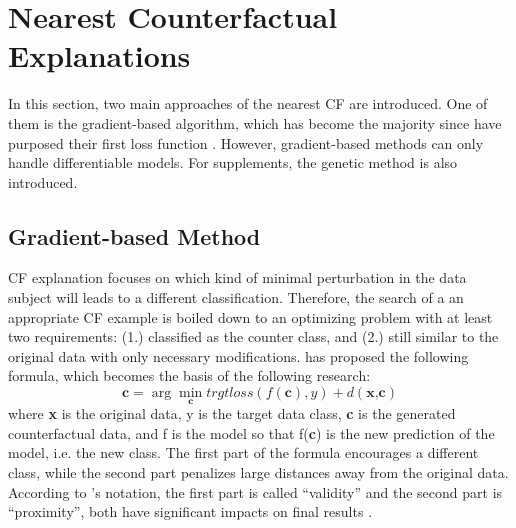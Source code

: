 \section{Nearest Counterfactual Explanations}\label{sec:generation}
In this section, two main approaches of the nearest CF are introduced. One of them is the gradient-based algorithm, which has become the majority since \citeauthor{watcher2017} \cite{watcher2017} have purposed their first loss function \cite{CFReview}. However, gradient-based methods can only handle differentiable models. For supplements, the genetic method is also introduced.

\subsection{Gradient-based Method}\label{sec:lossFunc}
CF explanation focuses on which kind of minimal perturbation in the data subject will leads to a different classification. Therefore, the search of a an appropriate CF example is boiled down to an optimizing problem with at least two requirements: (1.) classified as the counter class, and (2.) still similar to the original data with only necessary modifications. \citeauthor{watcher2017} \cite{watcher2017} has proposed the following formula, which becomes the basis of the following research:
\begin{equation}\label{eq:watcher}
  \textbf{c}=\arg\min_{\textbf{c}}trgtloss(f(\textbf{c}),y)+d(\textbf{x,c})
\end{equation}
where \textbf{x} is the original data, y is the target data class, \textbf{c} is the generated counterfactual data, and f is the model so that f(\textbf{c}) is the new prediction of the model, i.e. the new class. The first part of the formula encourages a different class, while the second part penalizes large distances away from the original data. According to \citeauthor{watcher2017}'s notation, the first part is called ``validity'' and the second part is ``proximity'', both have significant impacts on final results \cite{watcher2017}.

